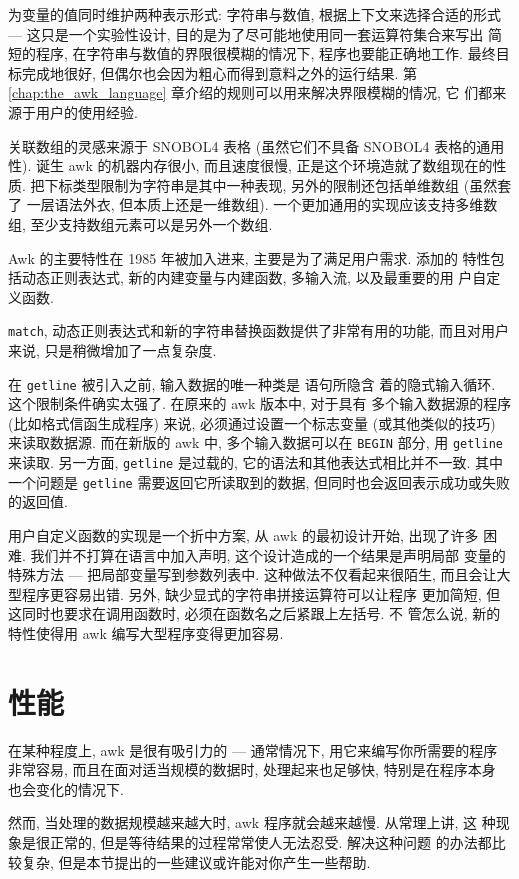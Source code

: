 为变量的值同时维护两种表示形式: 字符串与数值, 根据上下文来选择合适的形式
--- 这只是一个实验性设计, 目的是为了尽可能地使用同一套运算符集合来写出
简短的程序, 在字符串与数值的界限很模糊的情况下, 程序也要能正确地工作.
最终目标完成地很好, 但偶尔也会因为粗心而得到意料之外的运行结果. 第 
\ref{chap:the_awk_language} 章介绍的规则可以用来解决界限模糊的情况, 它
们都来源于用户的使用经验.

关联数组的灵感来源于 SNOBOL4 表格 (虽然它们不具备 SNOBOL4 表格的通用性).
诞生 awk 的机器内存很小, 而且速度很慢, 正是这个环境造就了数组现在的性质.
把下标类型限制为字符串是其中一种表现, 另外的限制还包括单维数组 (虽然套了
一层语法外衣, 但本质上还是一维数组). 一个更加通用的实现应该支持多维数组,
至少支持数组元素可以是另外一个数组.

Awk 的主要特性在 1985 年被加入进来, 主要是为了满足用户需求. 添加的
特性包括动态正则表达式, 新的内建变量与内建函数, 多输入流, 以及最重要的用
户自定义函数.

\texttt{match}, 动态正则表达式和新的字符串替换函数提供了非常有用的功能,
而且对用户来说, 只是稍微增加了一点复杂度.

在 \texttt{getline} 被引入之前, 输入数据的唯一种类是 \patact 语句所隐含
着的隐式输入循环. 这个限制条件确实太强了. 在原来的 awk 版本中, 对于具有
多个输入数据源的程序 (比如格式信函生成程序) 来说, 必须通过设置一个标志变量
(或其他类似的技巧) 来读取数据源. 而在新版的 awk 中, 多个输入数据可以在
\texttt{BEGIN} 部分, 用 \texttt{getline} 来读取. 另一方面, \texttt{getline}
是过载的, 它的语法和其他表达式相比并不一致. 其中一个问题是 \texttt{getline}
需要返回它所读取到的数据, 但同时也会返回表示成功或失败的返回值.

用户自定义函数的实现是一个折中方案, 从 awk 的最初设计开始, 出现了许多
困难. 我们并不打算在语言中加入声明, 这个设计造成的一个结果是声明局部
变量的特殊方法 --- 把局部变量写到参数列表中. 这种做法不仅看起来很陌生,
而且会让大型程序更容易出错. 另外, 缺少显式的字符串拼接运算符可以让程序
更加简短, 但这同时也要求在调用函数时, 必须在函数名之后紧跟上左括号. 不
管怎么说, 新的特性使得用 awk 编写大型程序变得更加容易.

\section{性能}
\label{sec:performance}
在某种程度上, awk 是很有吸引力的 --- 通常情况下, 用它来编写你所需要的程序
非常容易, 而且在面对适当规模的数据时, 处理起来也足够快, 特别是在程序本身
也会变化的情况下.

然而, 当处理的数据规模越来越大时, awk 程序就会越来越慢. 从常理上讲, 这
种现象是很正常的, 但是等待结果的过程常常使人无法忍受. 解决这种问题
的办法都比较复杂, 但是本节提出的一些建议或许能对你产生一些帮助.

